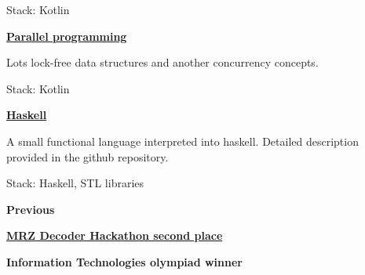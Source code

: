 \documentclass[11pt,a4paper]{report}
\begin{document}
\hspace{20px} Stack: Kotlin

\vspace{10px}

\hspace{10px} \textbf{\href{https://github.com/Kvel4/itmo-mpp}{Parallel programming}}

\hspace{20px} Lots lock-free data structures and another concurrency concepts.

\hspace{20px} Stack: Kotlin

\vspace{10px}


\hspace{10px} \textbf{\href{https://github.com/Kvel4/haskell}{Haskell}} 

\hspace{20px} A small functional language interpreted into haskell. Detailed description provided in the github repository.

\hspace{20px} Stack: Haskell, STL libraries

\vspace{10px}

\vspace{10px}

\textbf{\Large{Previous}}

\hspace{10px} \textbf{\href{https://github.com/Kvel4/MRZ_codes}{MRZ Decoder Hackathon second place}}

\vspace{5px}

\hspace{10px} \textbf{Information Technologies olympiad winner}
\end{document}
